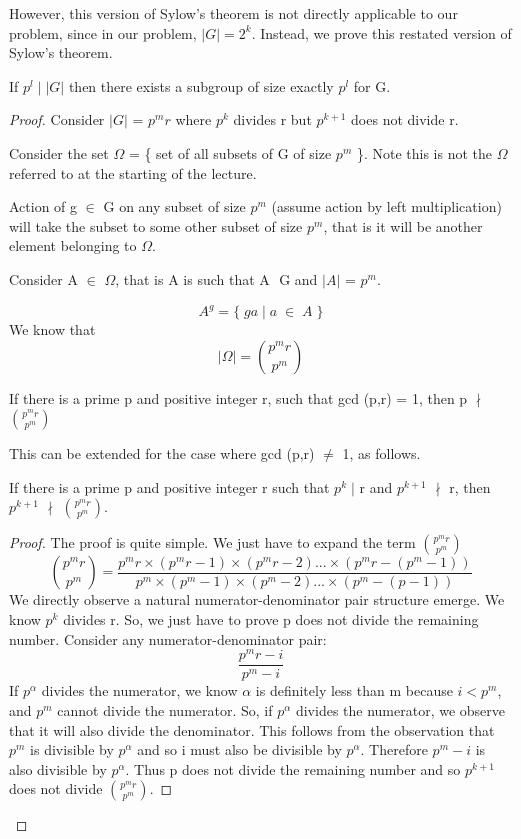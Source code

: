However, this version of Sylow's theorem is not directly applicable to our problem, since in our problem, $|G| = 2^{k}$. Instead, we prove this restated version of Sylow's theorem.

\begin{theorem}
If $p^{l} \; | \; |G|$ then there exists a subgroup of size exactly $p^{l}$ for G.
\end{theorem}

\begin{proof}

Consider $|G|$ = $p^{m}r$ where $p^{k}$ divides r but $p^{k+1}$ does not divide r.

Consider the set $\Omega$ = \{ set of all subsets of G of size $p^{m}$ \}. Note this is not the $\Omega$ referred to at the starting of the lecture.

Action of g $\in$ G on any subset of size $p^{m}$ (assume action by left multiplication) will take the subset to some other subset of size $p^{m}$, that is it will be another element belonging to $\Omega$.

Consider A $\in$ $\Omega$, that is A is such that A $ $ G and $|A|$ = $p^{m}$.

$$ A^{g} = \{\; ga\; | \; a\; \in \; A \;\} $$
We know that
$$ |\Omega| = {p^{m}r \choose p^{m}} $$

\begin{theorem}
If there is a prime p and positive integer r, such that gcd (p,r) = 1, then p $\nmid$ ${p^{m}r \choose p^{m}}$
\end{theorem}

This can be extended for the case where gcd (p,r) $\neq$ 1, as follows.
\begin{theorem}
If there is a prime p and positive integer r such that $p^{k} \;|$ r and $p^{k+1}$ $\nmid$ r, then $p^{k+1}$ $\nmid$ $p^{m}r \choose p^{m}$. 
\end{theorem}
\begin{proof}
The proof is quite simple. We just have to expand the term $p^{m}r \choose p^{m}$
\[  {p^{m}r \choose p^{m}} = \frac{p^{m}r \times (p^{m}r - 1) \times (p^{m}r - 2) ... \times (p^{m}r - (p^{m} - 1))}{p^{m} \times (p^{m} - 1) \times (p^{m} - 2) ... \times (p^{m} - (p - 1))} \]
We directly observe a natural numerator-denominator pair structure emerge. We know $p^{k}$ divides r. So, we just have to prove p does not divide the remaining number. Consider any numerator-denominator pair:
$$ \frac{p^{m}r - i}{p^{m} - i} $$
If $p^{\alpha}$ divides the numerator, we know $\alpha$ is definitely less than m because $i < p^{m}$, and $p^{m}$ cannot divide the numerator. So, if $p^{\alpha}$ divides the numerator, we observe that it will also divide the denominator. This follows from the observation that $p^{m}$ is divisible by $p^{\alpha}$ and so i must also be divisible by $p^{\alpha}$. Therefore $p^{m} - i$ is also divisible by $p^{\alpha}$. Thus p does not divide the remaining number and so $p^{k+1}$ does not divide $p^{m}r \choose p^{m}$. 
\end{proof}


\end{proof}
